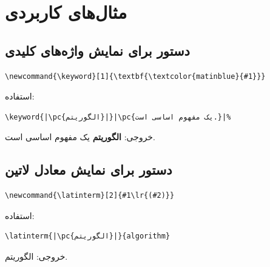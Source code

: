 
\section{مثال‌های کاربردی}
\label{sec:custom-commands-examples}

\subsection{دستور برای نمایش واژه‌های کلیدی}
\label{sec:custom-commands-keyword}

\begin{latin}
\begin{verbatim}
\newcommand{\keyword}[1]{\textbf{\textcolor{matinblue}{#1}}}
\end{verbatim}
\end{latin}

استفاده:

\begin{latin}
\begin{verbatim}
\keyword{|\pc{الگوریتم}|}|\pc{یک مفهوم اساسی است.}|%
\end{verbatim}
\end{latin}

خروجی: \textbf{\textcolor{matinblue}{الگوریتم}}
یک مفهوم اساسی است.

\subsection{دستور برای نمایش معادل لاتین}
\label{sec:custom-commands-latin-equiv}

\begin{latin}
\begin{verbatim}
\newcommand{\latinterm}[2]{#1\lr{(#2)}}
\end{verbatim}
\end{latin}

استفاده:

\begin{latin}
\begin{verbatim}
\latinterm{|\pc{الگوریتم}|}{algorithm}
\end{verbatim}
\end{latin}

خروجی: الگوریتم.


